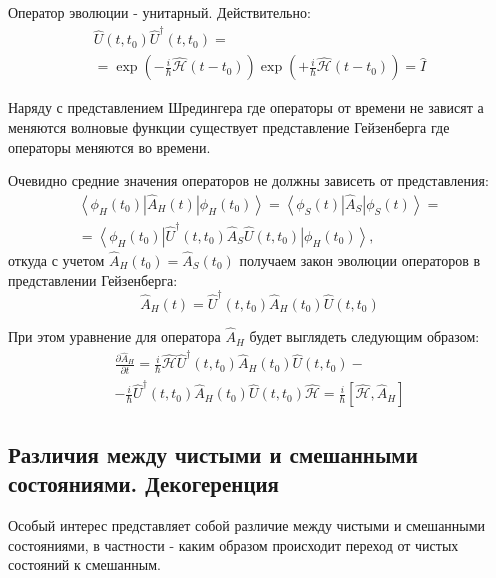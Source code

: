 Оператор эволюции - унитарный. Действительно:
\begin{eqnarray}
\hat{U}\left(t,t_0\right)\hat{U}^\dag\left(t,t_0\right) = 
\nonumber \\
= \exp\left( -\frac{i}{\hbar} \hat{\mathcal{H}} \left( t - t_0 \right)
\right)
\exp\left( +\frac{i}{\hbar} \hat{\mathcal{H}} \left( t - t_0 \right)
\right)
= \hat{I}
\nonumber
\end{eqnarray}

Наряду с представлением Шредингера где операторы от времени не зависят
а меняются волновые функции существует представление Гейзенберга где
операторы меняются во времени.

Очевидно средние значения операторов не должны зависеть от
представления:
\begin{eqnarray}
\left< \phi_H\left(t_0\right) \right|\hat{A}_H\left(t\right)\left| 
\phi_H\left(t_0\right) \right> = 
\left< \phi_S\left(t\right) \right|\hat{A}_S\left| 
\phi_S\left(t\right) \right> = 
\nonumber \\
=
\left<
\phi_H\left(t_0\right)\right|\hat{U}^\dag\left(t,t_0\right)\hat{A}_S\hat{U}\left(t,t_0\right)\left|
\phi_H\left(t_0\right) \right>,
\nonumber
\end{eqnarray}
откуда с учетом $\hat{A}_H\left(t_0\right) = \hat{A}_S\left(t_0\right)$ получаем закон эволюции операторов в представлении Гейзенберга:
\begin{equation}
\hat{A}_H\left(t\right) = \hat{U}^\dag\left(t,t_0\right)\hat{A}_H\left(t_0\right)\hat{U}\left(t,t_0\right)
\label{eqAddWaveFunc_HeizenbergU}
\end{equation}

При этом уравнение для оператора $\hat{A}_H$ будет выглядеть следующим
образом:
\begin{eqnarray}
  \frac{\partial \hat{A}_H}{\partial t} =
  \frac{i}{\hbar} \hat{\mathcal{H}}
  \hat{U}^\dag\left(t,t_0\right)\hat{A}_H\left(t_0\right)\hat{U}\left(t,t_0\right)
  -
  \nonumber \\
  - \frac{i}{\hbar}
  \hat{U}^\dag\left(t,t_0\right)\hat{A}_H\left(t_0\right)\hat{U}\left(t,t_0\right)
  \hat{\mathcal{H}} =
  \frac{i}{\hbar} \left[\hat{\mathcal{H}}, \hat{A}_H \right]
  \label{eqAddWaveFunc_HeizenbergT}
\end{eqnarray}

\subsection{Различия между чистыми и смешанными
  состояниями. Декогеренция}
Особый интерес представляет собой различие между чистыми и смешанными
состояниями, в частности - каким образом происходит переход от чистых
состояний к смешанным.

